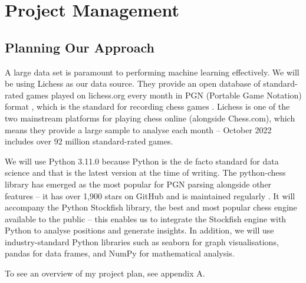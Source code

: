 \documentclass[%
 superscriptaddress,
showpacs,preprintnumbers,
 amsmath,
 amssymb,
 aps,
 pra,
showkeys,
onecolumn,
notitlepage,
11pt,
tightenlines      %
]{revtex4-1}
\begin{document}
\section{Project Management}


\subsection{Planning Our Approach}
A large data set is paramount to performing machine learning effectively. We will be using Lichess as our data source. They provide an open database of standard-rated games played on lichess.org every month in PGN (Portable Game Notation) format \cite{lichessOpenDatabase}, which is the standard for recording chess games \cite{pgnExplanation}. Lichess is one of the two mainstream platforms for playing chess online (alongside Chess.com), which means they provide a large sample to analyse each month -- October 2022 includes over 92 million standard-rated games.

We will use Python 3.11.0 because Python is the de facto standard for data science \cite{pythonForDataScience} and that is the latest version at the time of writing. The python-chess library has emerged as the most popular for PGN parsing alongside other features -- it has over 1,900 stars on GitHub and is maintained regularly \cite{pythonChessLibrary}. It will accompany the Python Stockfish library, the best and most popular chess engine available to the public \cite{aboutStockfish} -- this enables us to integrate the Stockfish engine with Python to analyse positions and generate insights. In addition, we will use industry-standard Python libraries such as seaborn for graph visualisations, pandas for data frames, and NumPy for mathematical analysis.

To see an overview of my project plan, see appendix A.
\end{document}
